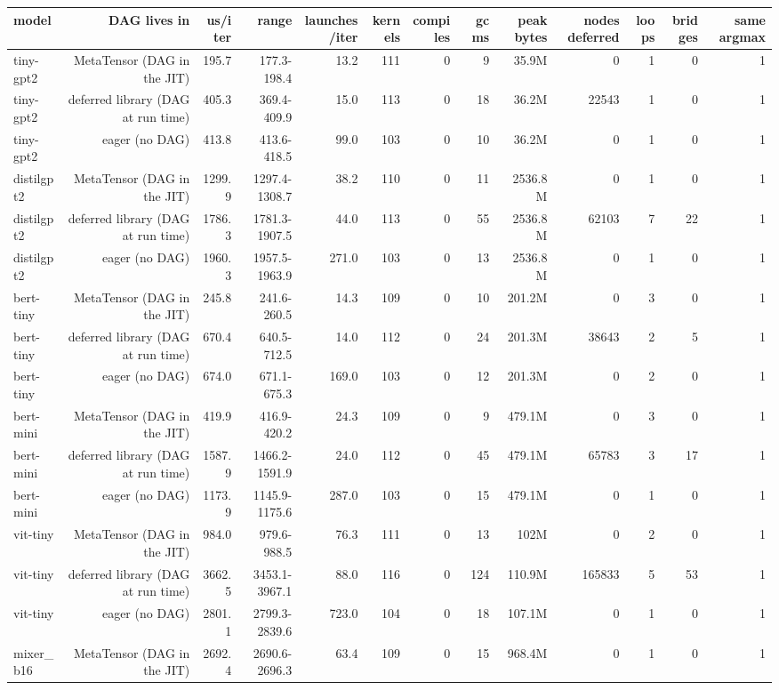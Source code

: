 \begin{tabular}{lrrrrrrrrrrrr}
\toprule
model & DAG lives in & us/iter & range & launches/iter & kernels & compiles & gc ms & peak bytes & nodes deferred & loops & bridges & same argmax \\
\midrule
tiny-gpt2 & MetaTensor (DAG in the JIT) & 195.7 & 177.3-198.4 & 13.2 & 111 & 0 & 9 & 35.9M & 0 & 1 & 0 & 1 \\
tiny-gpt2 & deferred library (DAG at run time) & 405.3 & 369.4-409.9 & 15.0 & 113 & 0 & 18 & 36.2M & 22543 & 1 & 0 & 1 \\
tiny-gpt2 & eager (no DAG) & 413.8 & 413.6-418.5 & 99.0 & 103 & 0 & 10 & 36.2M & 0 & 1 & 0 & 1 \\
distilgpt2 & MetaTensor (DAG in the JIT) & 1299.9 & 1297.4-1308.7 & 38.2 & 110 & 0 & 11 & 2536.8M & 0 & 1 & 0 & 1 \\
distilgpt2 & deferred library (DAG at run time) & 1786.3 & 1781.3-1907.5 & 44.0 & 113 & 0 & 55 & 2536.8M & 62103 & 7 & 22 & 1 \\
distilgpt2 & eager (no DAG) & 1960.3 & 1957.5-1963.9 & 271.0 & 103 & 0 & 13 & 2536.8M & 0 & 1 & 0 & 1 \\
bert-tiny & MetaTensor (DAG in the JIT) & 245.8 & 241.6-260.5 & 14.3 & 109 & 0 & 10 & 201.2M & 0 & 3 & 0 & 1 \\
bert-tiny & deferred library (DAG at run time) & 670.4 & 640.5-712.5 & 14.0 & 112 & 0 & 24 & 201.3M & 38643 & 2 & 5 & 1 \\
bert-tiny & eager (no DAG) & 674.0 & 671.1-675.3 & 169.0 & 103 & 0 & 12 & 201.3M & 0 & 2 & 0 & 1 \\
bert-mini & MetaTensor (DAG in the JIT) & 419.9 & 416.9-420.2 & 24.3 & 109 & 0 & 9 & 479.1M & 0 & 3 & 0 & 1 \\
bert-mini & deferred library (DAG at run time) & 1587.9 & 1466.2-1591.9 & 24.0 & 112 & 0 & 45 & 479.1M & 65783 & 3 & 17 & 1 \\
bert-mini & eager (no DAG) & 1173.9 & 1145.9-1175.6 & 287.0 & 103 & 0 & 15 & 479.1M & 0 & 1 & 0 & 1 \\
vit-tiny & MetaTensor (DAG in the JIT) & 984.0 & 979.6-988.5 & 76.3 & 111 & 0 & 13 & 102M & 0 & 2 & 0 & 1 \\
vit-tiny & deferred library (DAG at run time) & 3662.5 & 3453.1-3967.1 & 88.0 & 116 & 0 & 124 & 110.9M & 165833 & 5 & 53 & 1 \\
vit-tiny & eager (no DAG) & 2801.1 & 2799.3-2839.6 & 723.0 & 104 & 0 & 18 & 107.1M & 0 & 1 & 0 & 1 \\
mixer\_b16 & MetaTensor (DAG in the JIT) & 2692.4 & 2690.6-2696.3 & 63.4 & 109 & 0 & 15 & 968.4M & 0 & 1 & 0 & 1 \\

\end{tabular}
